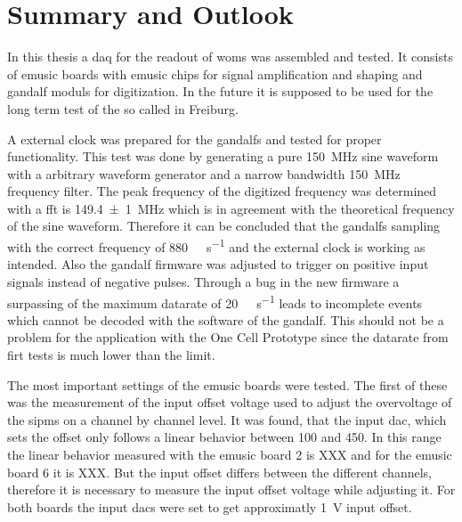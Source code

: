 \chapter{Summary and Outlook}
In this thesis a \ac{daq} for the readout of \acp{wom} was assembled and tested.
It consists of \ac{emusic} boards with \ac{emusic} chips for signal amplification and shaping and \ac{gandalf} moduls for digitization.
In the future it is supposed to be used for the long term test of the so called  in Freiburg.

A external clock was prepared for the \acp{gandalf} and tested for proper functionality.
This test was done by generating a pure \SI{150}{\mega\hertz} sine waveform with a arbitrary waveform generator and a narrow bandwidth \SI{150}{\mega\hertz} frequency filter.
The peak frequency of the digitized frequency was determined with a \ac{fft} is \SI{149.4(10)}{\mega\hertz} which is in agreement with the theoretical frequency of the sine waveform.
Therefore it can be concluded that the \acp{gandalf} sampling with the correct frequency of \SI{880}{\mega\sample\per\second} and the external clock is working as intended.
Also the \ac{gandalf} firmware was adjusted to trigger on positive input signals instead of negative pulses.
Through a bug in the new firmware a surpassing of the maximum datarate of \SI{20}{\mega\byte\per\second} leads to incomplete events which cannot be decoded with the software of the \ac{gandalf}.
This should not be a problem for the application with the One Cell Prototype since the datarate from firt tests is much lower than the limit.

The most important settings of the \ac{emusic} boards were tested.
The first of these was the measurement of the input offset voltage used to adjust the overvoltage of the \acp{sipm} on a channel by channel level.
It was found, that the input \ac{dac}, which sets the offset only follows a linear behavior between \SI{100}{\dacu} and \SI{450}{\dacu}.
In this range the linear behavior measured with the \ac{emusic} board 2 is XXX and for the \ac{emusic} board 6 it is XXX.
But the input offset differs between the different channels, therefore it is necessary to measure the input offset voltage while adjusting it.
For both boards the input \acp{dac} were set to get approximatly \SI{1}{\volt} input offset.


